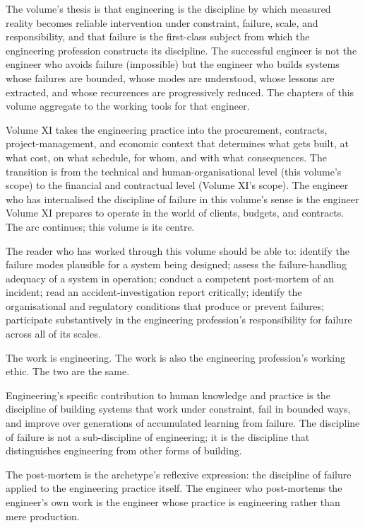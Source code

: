 The volume's thesis is that engineering is the discipline by which measured reality becomes reliable intervention under constraint, failure, scale, and responsibility, and that failure is the first-class subject from which the engineering profession constructs its discipline. The successful engineer is not the engineer who avoids failure (impossible) but the engineer who builds systems whose failures are bounded, whose modes are understood, whose lessons are extracted, and whose recurrences are progressively reduced. The chapters of this volume aggregate to the working tools for that engineer.

Volume XI takes the engineering practice into the procurement, contracts, project-management, and economic context that determines what gets built, at what cost, on what schedule, for whom, and with what consequences. The transition is from the technical and human-organisational level (this volume's scope) to the financial and contractual level (Volume XI's scope). The engineer who has internalised the discipline of failure in this volume's sense is the engineer Volume XI prepares to operate in the world of clients, budgets, and contracts. The arc continues; this volume is its centre.

The reader who has worked through this volume should be able to: identify the failure modes plausible for a system being designed; assess the failure-handling adequacy of a system in operation; conduct a competent post-mortem of an incident; read an accident-investigation report critically; identify the organisational and regulatory conditions that produce or prevent failures; participate substantively in the engineering profession's responsibility for failure across all of its scales.

The work is engineering. The work is also the engineering profession's working ethic. The two are the same.

\begin{principle}
Engineering's specific contribution to human knowledge and practice is the discipline of building systems that work under constraint, fail in bounded ways, and improve over generations of accumulated learning from failure. The discipline of failure is not a sub-discipline of engineering; it is the discipline that distinguishes engineering from other forms of building.
\end{principle}

\begin{archetype}[failure]
The post-mortem is the archetype's reflexive expression: the discipline of failure applied to the engineering practice itself. The engineer who post-mortems the engineer's own work is the engineer whose practice is engineering rather than mere production.
\end{archetype}

